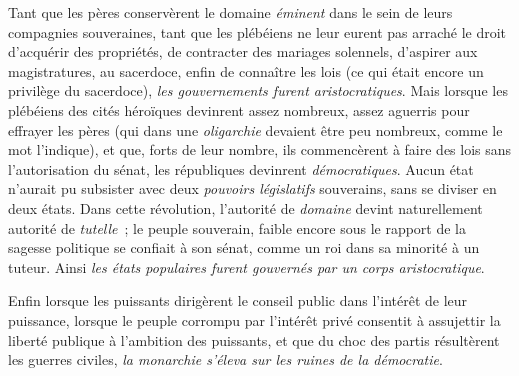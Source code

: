 \documentclass[french,twoside]{book} %
\begin{document}
Tant que les pères conservèrent le domaine {\itshape éminent} dans le sein de leurs compagnies souveraines, tant que les plébéiens ne leur eurent pas arraché le droit d’acquérir des propriétés, de contracter des mariages solennels, d’aspirer aux magistratures, au sacerdoce, enfin de connaître les lois (ce qui était encore un privilège du sacerdoce), {\itshape les gouvernements furent aristocratiques}. Mais lorsque les plébéiens des cités héroïques devinrent assez nombreux, assez aguerris pour effrayer les pères (qui dans une {\itshape oligarchie} devaient être peu nombreux, comme le mot l’indique), et que, forts de leur  nombre, ils commencèrent à faire des lois sans l’autorisation du sénat, les républiques devinrent {\itshape démocratiques}. Aucun état n’aurait pu subsister avec deux {\itshape pouvoirs législatifs} souverains, sans se diviser en deux états. Dans cette révolution, l’autorité de {\itshape domaine} devint naturellement autorité de {\itshape tutelle} ; le peuple souverain, faible encore sous le rapport de la sagesse politique se confiait à son sénat, comme un roi dans sa minorité à un tuteur. Ainsi {\itshape les états populaires furent gouvernés par un corps aristocratique}.\par
Enfin lorsque les puissants dirigèrent le conseil public dans l’intérêt de leur puissance, lorsque le peuple corrompu par l’intérêt privé consentit à assujettir la liberté publique à l’ambition des puissants, et que du choc des partis résultèrent les guerres civiles, {\itshape la monarchie s’éleva sur les ruines de la démocratie}.
\end{document}
